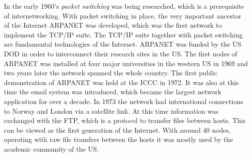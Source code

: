 \documentclass[a4paper,11pt]{kth-mag}
\begin{document}
        In the early 1960's \emph{packet switching} was being researched, which is a prerequisite of internetworking.
        With packet switching in place, the very important ancestor of the Internet \gls{ARPANET} was developed, which was the first network to implement the \gls{TCP}/\gls{IP} suite.
        The \gls{TCP}/\gls{IP} suite together with packet switching are fundamental technologies of the Internet.
        \gls{ARPANET} was funded by the \gls{US} \gls{DOD} in order to interconnect their research sites in the \gls{US}.
        The first nodes of \gls{ARPANET} was installed at four major universities in the western \gls{US} in 1969 and two years later the network spanned the whole country.
        The first public demonstration of \gls{ARPANET} was held at the \gls{ICCC} in 1972.
        It was also at this time the email system was introduced, which became the largest network application for over a decade.
        In 1973 the network had international connections to Norway and London via a satellite link.
        At this time information was exchanged with the \gls{FTP}, which is a protocol to transfer files between hosts.
        This can be viewed as the first generation of the Internet. With around 40 nodes, operating with raw file transfers between the hosts it was mostly used by the academic community of the \gls{US}.
\end{document}
